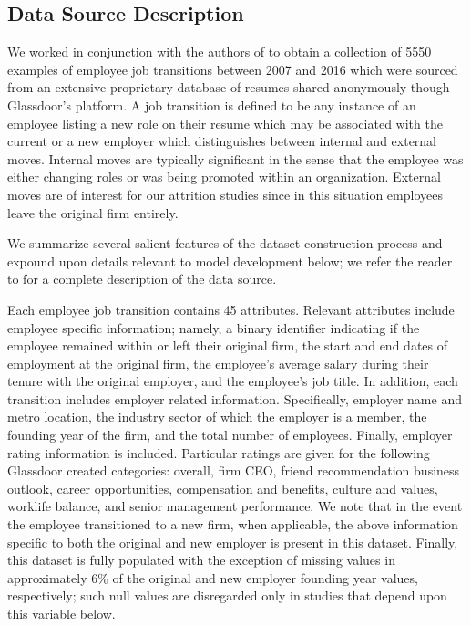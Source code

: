 \documentclass[10pt]{article}
\begin{document}
\subsection{Data Source Description}\label{datdes}

We worked in conjunction with the authors of \cite{Smart2016} to obtain 
a collection of 5550 examples of employee job transitions between 
2007 and 2016 which were sourced from an extensive proprietary database of 
resumes shared anonymously though Glassdoor's platform.  A job transition 
is defined to be any instance of an employee listing a new role on their 
resume which may be associated with the current or a new employer
which distinguishes between internal and external moves.  Internal moves are typically 
significant in the sense that the employee was either changing roles or was
being promoted within an organization. External moves are of interest for our 
attrition studies since in this situation employees leave the original 
firm entirely.

We summarize several salient features of the dataset construction process 
and expound upon details relevant to model development below; we refer the
reader to \cite{Smart2016} for a complete description of the data source. 

Each employee job transition contains 45 attributes.  Relevant attributes 
include employee specific information; namely, a binary identifier 
indicating if the employee remained within or left their original firm,
the start and end dates of employment at the original firm, the 
employee's average salary during their tenure with the original employer, 
and the employee's job title. 
In addition, each transition includes employer related information. 
Specifically, employer name and metro location, the industry sector of which the employer 
is a member, the founding year of the firm, and the total number of employees. 
Finally, employer rating information is included.  Particular ratings are 
given for the following Glassdoor created categories: overall, firm CEO, friend recommendation 
business outlook, career opportunities, compensation and benefits, culture and values, 
worklife balance, and senior management performance. 
We note that in the event the employee transitioned to a new firm, when applicable,
the above information specific to both the original and new employer is present in this dataset. 
Finally, this dataset is fully populated with the exception of missing values in 
approximately 6\% of the original and new employer founding year values, respectively;
such null values are disregarded 
only in studies that depend upon this variable below.
\end{document}
